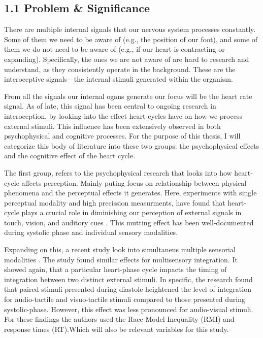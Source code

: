 \documentclass[12pt,oneside,openright]{report}
\begin{document}
\subsection*{1.1 Problem \& Significance}
There are multiple internal signals that our nervous system processes constantly. Some of them we need to be aware of (e.g., the position of our foot), and some of them we do not need to be aware of (e.g., if our heart is contracting or expanding). Specifically, the ones we are not aware of are hard to research and understand, as they consistently operate in the background. These are the interoceptive signals—the internal stimuli generated within the organism.

From all the signals our internal ogans generate our focus will be the heart rate signal. As of late, this signal has been central to ongoing research in interoception, by looking into the effect heart-cycles have on how we process external stimuli. This influence has been extensively observed in both psychophysical and cognitive processes. For the purpose of this thesis, I will  categorize this body of literature into these two groups: the psychophysical effects and the cognitive effect of the heart cycle.

The first group, refers to the psychophysical research that looks into how heart-cycle affects perception. Mainly puting focus on relationship between physical phenomena and the perceptual effects it generates. Here, experiments with single perceptual modality and high precission measurments, have found that heart-cycle plays a crucial role in diminishing our perception of external signals in touch, vision, and auditory cues \parencite{Sandman1977-li, esra_p, AL2021118247, Grund643, motyka, Park2014}. This mutting effect has been well-documented during systolic phase and individual sensory modalities. 

Expanding on this, a recent study look into simultaneus multiple sensorial modalities \parencite{SALTAFOSSI2023108642}. The study found similar effects for multisensory integration. It showed again, that a particular heart-phase cycle impacts the timing of integration between two distinct external stimuli. In specific, the research found that paired stimuli presented during diastole heightened the level of integration for audio-tactile and visuo-tactile stimuli compared to those presented during systolic-phase. However, this effect was less pronounced for audio-visual stimuli. For these findings the authors used the Race Model Inequality (RMI) and response times (RT).Which will also be relevant variables for this study.  
\end{document}

